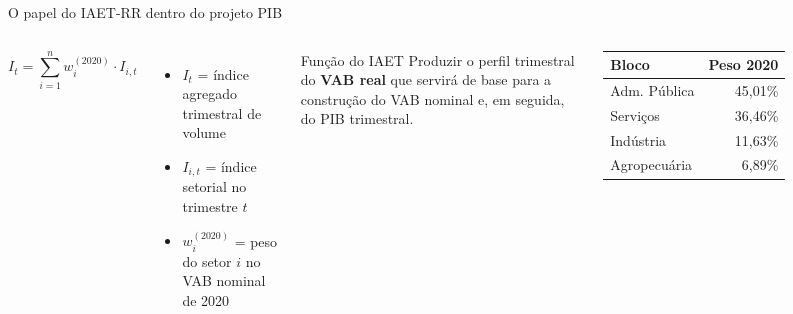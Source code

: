 \documentclass[aspectratio=169,11pt]{beamer}
\begin{document}
\begin{frame}{O papel do IAET-RR dentro do projeto PIB}
\begin{columns}[T]
\[
I_t = \sum_{i=1}^{n} w_i^{(2020)} \cdot I_{i,t}
\]

\begin{itemize}
  \item \(I_t\) = índice agregado trimestral de volume
  \item \(I_{i,t}\) = índice setorial no trimestre \(t\)
  \item \(w_i^{(2020)}\) = peso do setor \(i\) no VAB nominal de 2020
\end{itemize}

\begin{block}{Função do IAET}
Produzir o perfil trimestral do \textbf{VAB real} que servirá de base para a construção do VAB nominal e, em seguida, do PIB trimestral.
\end{block}

\small
\begin{tabular}{lr}
\toprule
\textbf{Bloco} & \textbf{Peso 2020} \\
\midrule
Adm. Pública & 45,01\% \\
Serviços & 36,46\% \\
Indústria & 11,63\% \\
Agropecuária & 6,89\% \\
\bottomrule
\end{tabular}
\end{columns}
\end{frame}
\end{document}
